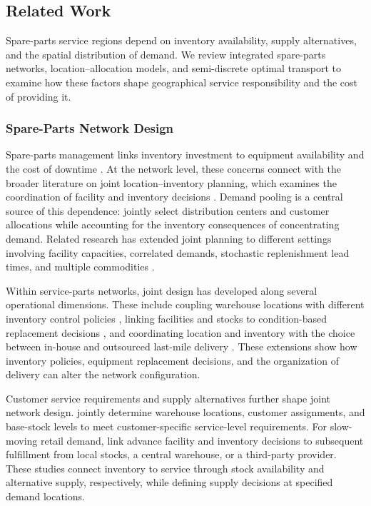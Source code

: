 \documentclass[a4paper,fleqn]{cas-sc}
\theoremstyle{remark}
\theoremstyle{plain}
\begin{document}
\subsection{Related Work}\label{sec:literature_review}

Spare-parts service regions depend on inventory availability, supply alternatives, and the spatial distribution of demand. We review integrated spare-parts networks, location--allocation models, and semi-discrete optimal transport to examine how these factors shape geographical service responsibility and the cost of providing it.

\subsubsection{Spare-Parts Network Design}\label{subsec:lit_network}

Spare-parts management links inventory investment to equipment availability and the cost of downtime \citep{hu2018or}. At the network level, these concerns connect with the broader literature on joint location--inventory planning, which examines the coordination of facility and inventory decisions \citep{puttemans2025integration}. Demand pooling is a central source of this dependence: \citet{shen2003joint} jointly select distribution centers and customer allocations while accounting for the inventory consequences of concentrating demand. Related research has extended joint planning to different settings involving facility capacities, correlated demands, stochastic replenishment lead times, and multiple commodities \citep{atamturk2012conic}.

Within service-parts networks, joint design has developed along several operational dimensions. These include coupling warehouse locations with different inventory control policies \citep{tapia2020modelling}, linking facilities and stocks to condition-based replacement decisions \citep{karatas2021joint}, and coordinating location and inventory with the choice between in-house and outsourced last-mile delivery \citep{zhao2024outsourcing}. These extensions show how inventory policies, equipment replacement decisions, and the organization of delivery can alter the network configuration.

Customer service requirements and supply alternatives further shape joint network design. \citet{candas2020service} jointly determine warehouse locations, customer assignments, and base-stock levels to meet customer-specific service-level requirements. For slow-moving retail demand, \citet{chu2025integrated} link advance facility and inventory decisions to subsequent fulfillment from local stocks, a central warehouse, or a third-party provider. These studies connect inventory to service through stock availability and alternative supply, respectively, while defining supply decisions at specified demand locations.
\end{document}
